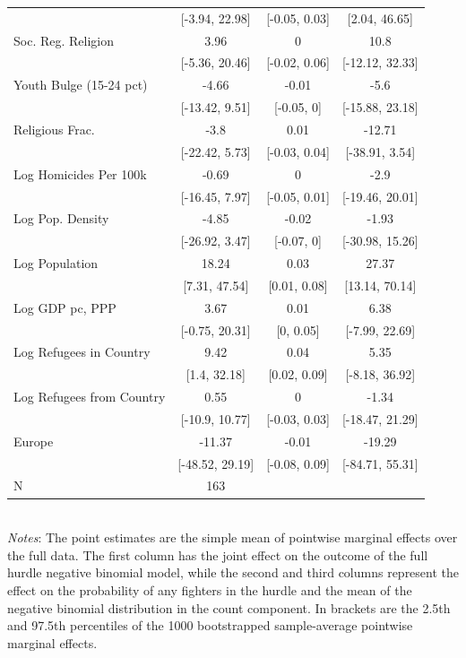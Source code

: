 \documentclass[12pt]{article}
\begin{document}
\begin{table}[!p]
\begin{tabular}{l ccc}
& [-3.94, 22.98] & [-0.05, 0.03] & [2.04, 46.65] \\ 
Soc. Reg. Religion & 3.96 & 0 & 10.8 \\ 
& [-5.36, 20.46] & [-0.02, 0.06] & [-12.12, 32.33] \\ 
Youth Bulge (15-24 pct) & -4.66 & -0.01 & -5.6 \\ 
& [-13.42, 9.51] & [-0.05, 0] & [-15.88, 23.18] \\ 
Religious Frac. & -3.8 & 0.01 & -12.71 \\ 
& [-22.42, 5.73] & [-0.03, 0.04] & [-38.91, 3.54] \\ 
Log Homicides Per 100k & -0.69 & 0 & -2.9 \\ 
& [-16.45, 7.97] & [-0.05, 0.01] & [-19.46, 20.01] \\ 
Log Pop. Density & -4.85 & -0.02 & -1.93 \\ 
& [-26.92, 3.47] & [-0.07, 0] & [-30.98, 15.26] \\ 
Log Population & 18.24 & 0.03 & 27.37 \\ 
& [7.31, 47.54] & [0.01, 0.08] & [13.14, 70.14] \\ 
Log GDP pc, PPP & 3.67 & 0.01 & 6.38 \\ 
& [-0.75, 20.31] & [0, 0.05] & [-7.99, 22.69] \\ 
Log Refugees in Country & 9.42 & 0.04 & 5.35 \\ 
& [1.4, 32.18] & [0.02, 0.09] & [-8.18, 36.92] \\ 
Log Refugees from Country & 0.55 & 0 & -1.34 \\ 
& [-10.9, 10.77] & [-0.03, 0.03] & [-18.47, 21.29] \\ 
Europe & -11.37 & -0.01 & -19.29 \\ 
& [-48.52, 29.19] & [-0.08, 0.09] & [-84.71, 55.31] \\ 
\midrule
N & 163 & & \\
		\bottomrule
	\end{tabular}
	\\ \footnotesize \textit{Notes}: The point estimates are the simple mean of pointwise marginal effects over the full data. The first column has the joint effect on the outcome of the full hurdle negative binomial model, while the second and third columns represent the effect on the probability of any fighters in the hurdle and the mean of the negative binomial distribution in the count component. In brackets are the 2.5th and 97.5th percentiles of the 1000 bootstrapped sample-average pointwise marginal effects. 
\end{table}
\end{document}

